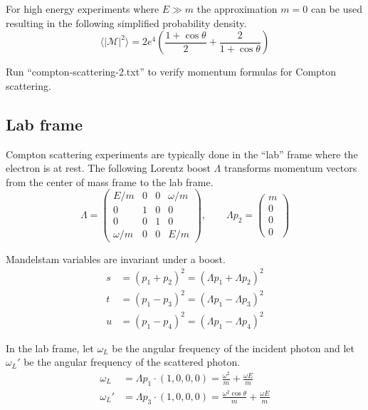 \documentclass[12pt]{article}
\begin{document}
\noindent
For high energy experiments where $E\gg m$ the approximation $m=0$ can be used
resulting in the following simplified probability density.
\begin{equation*}
\langle|\mathcal{M}|^2\rangle
=
2e^4\left(
\frac{1+\cos\theta}{2}+\frac{2}{1+\cos\theta}
\right)
\end{equation*}

\noindent
Run ``compton-scattering-2.txt'' to verify momentum formulas for Compton scattering.

\subsection*{Lab frame}
Compton scattering experiments are typically done in the ``lab'' frame where the electron is at rest.
The following Lorentz boost $\Lambda$ transforms momentum vectors from
the center of mass frame to the lab frame.
\begin{equation*}
\Lambda=
\begin{pmatrix}
E/m & 0 & 0 & \omega/m\\
0 & 1 & 0 & 0\\
0 & 0 & 1 & 0\\
\omega/m & 0 & 0 & E/m
\end{pmatrix},
\qquad
\Lambda p_2=\begin{pmatrix}m \\ 0 \\ 0 \\ 0\end{pmatrix}
\end{equation*}

\noindent
Mandelstam variables are invariant under a boost.
\begin{equation*}
\begin{aligned}
s&=(p_1+p_2)^2=(\Lambda p_1+\Lambda p_2)^2
\\
t&=(p_1-p_3)^2=(\Lambda p_1-\Lambda p_3)^2
\\
u&=(p_1-p_4)^2=(\Lambda p_1-\Lambda p_4)^2
\end{aligned}
\end{equation*}

\noindent
In the lab frame, let $\omega_L$ be the angular frequency of the incident photon
and let $\omega_L'$ be the angular frequency of the scattered photon.
\begin{equation*}
\begin{aligned}
\omega_L&=\Lambda p_1\cdot(1,0,0,0)=\frac{\omega^2}{m}+\frac{\omega E}{m}
\\
\omega_L'&=\Lambda p_3\cdot(1,0,0,0)=\frac{\omega^2\cos\theta}{m}+\frac{\omega E}{m}
\end{aligned}
\end{equation*}
\end{document}
